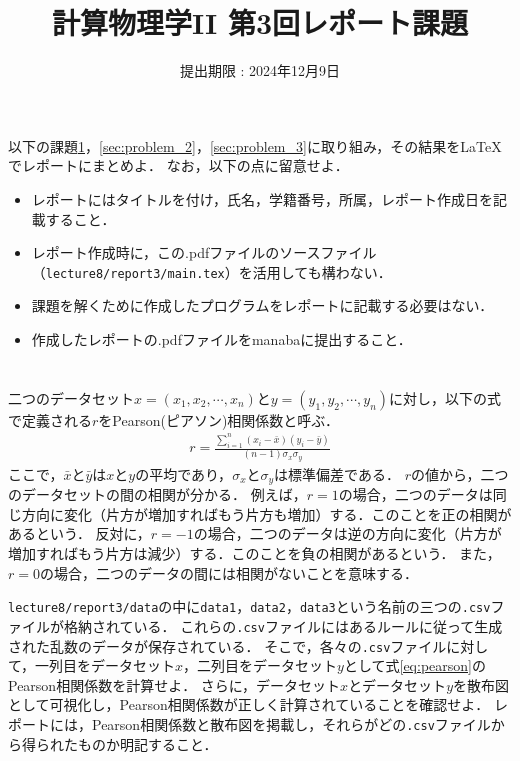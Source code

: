 \documentclass[a4paper,12pt]{jsarticle}
\title{計算物理学II 第3回レポート課題}
\date{提出期限 : 2024年12月9日}
\begin{document}
\maketitle

以下の課題\ref{sec:problem_1}，\ref{sec:problem_2}，\ref{sec:problem_3}に取り組み，その結果を\LaTeX でレポートにまとめよ．
なお，以下の点に留意せよ．
\begin{itemize}
    \item レポートにはタイトルを付け，氏名，学籍番号，所属，レポート作成日を記載すること．
    \item レポート作成時に，この.pdfファイルのソースファイル（\texttt{lecture8/report3/main.tex}）を活用しても構わない．
    \item 課題を解くために作成したプログラムをレポートに記載する必要はない．
    \item 作成したレポートの.pdfファイルをmanabaに提出すること．
\end{itemize}

\section{}
\label{sec:problem_1}

二つのデータセット$x=(x_{1},x_{2},\cdots,x_{n})$と$y=(y_{1},y_{2},\cdots,y_{n})$に対し，以下の式で定義される$r$をPearson(ピアソン)相関係数と呼ぶ．
\begin{align}
\label{eq:pearson}
    r=
    \frac{\sum_{i=1}^{n}(x_{i}-\bar{x})(y_{i}-\bar{y})}{(n-1)\sigma_{x}\sigma_{y}}
\end{align}
ここで，$\bar{x}$と$\bar{y}$は$x$と$y$の平均であり，$\sigma_{x}$と$\sigma_{y}$は標準偏差である．
$r$の値から，二つのデータセットの間の相関が分かる．
例えば，$r=1$の場合，二つのデータは同じ方向に変化（片方が増加すればもう片方も増加）する．このことを正の相関があるという．
反対に，$r=-1$の場合，二つのデータは逆の方向に変化（片方が増加すればもう片方は減少）する．このことを負の相関があるという．
また，$r=0$の場合，二つのデータの間には相関がないことを意味する．

\texttt{lecture8/report3/data}の中に\texttt{data1}，\texttt{data2}，\texttt{data3}という名前の三つの\texttt{.csv}ファイルが格納されている．
これらの\texttt{.csv}ファイルにはあるルールに従って生成された乱数のデータが保存されている．
そこで，各々の\texttt{.csv}ファイルに対して，一列目をデータセット$x$，二列目をデータセット$y$として式\eqref{eq:pearson}のPearson相関係数を計算せよ．
さらに，データセット$x$とデータセット$y$を散布図として可視化し，Pearson相関係数が正しく計算されていることを確認せよ．
レポートには，Pearson相関係数と散布図を掲載し，それらがどの\texttt{.csv}ファイルから得られたものか明記すること．\\
\end{document}
